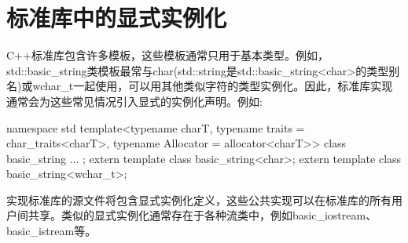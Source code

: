 \section{标准库中的显式实例化}
C++标准库包含许多模板，这些模板通常只用于基本类型。例如，std::basic\_string类模板最常与char(std::string是std::basic\_string<char>的类型别名)或wchar\_t一起使用，可以用其他类似字符的类型实例化。因此，标准库实现通常会为这些常见情况引入显式的实例化声明。例如:

\begin{cpp}
namespace std {
	template<typename charT, typename traits = char_traits<charT>,
	typename Allocator = allocator<charT>>
	class basic_string {
		...
	};
	extern template class basic_string<char>;
	extern template class basic_string<wchar_t>;
}
\end{cpp}

实现标准库的源文件将包含显式实例化定义，这些公共实现可以在标准库的所有用户间共享。类似的显式实例化通常存在于各种流类中，例如basic\_iostream、basic\_istream等。